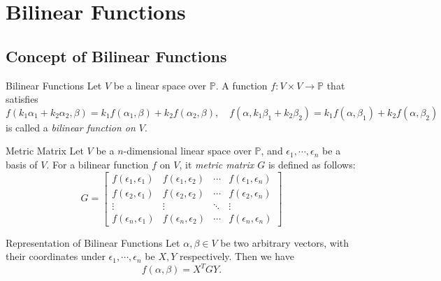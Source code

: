 
\section{Bilinear Functions}

\subsection{Concept of Bilinear Functions}

\begin{definition}{Bilinear Functions}{}
  Let $V$ be a linear space over $\mathbb{P}$.
  A function $f: V\times V \rightarrow \mathbb{P}$ that satisfies
  \begin{equation}
    f(k_1\alpha_1 + k_2\alpha_2, \beta) = k_1 f(\alpha_1, \beta) + k_2f(\alpha_2, \beta), \quad
    f(\alpha, k_1\beta_1 + k_2\beta_2) = k_1 f(\alpha, \beta_1) + k_2f(\alpha, \beta_2)
  \end{equation}
  is called a \emph{bilinear function on $V$}.
\end{definition}

\begin{definition}{Metric Matrix}{}
  Let $V$ be a $n$-dimensional linear space over $\mathbb{P}$,
  and $\epsilon_1,\cdots,\epsilon_n$ be a basis of $V$.
  For a bilinear function $f$ on $V$, 
  it \emph{metric matrix $G$} is defined as follows:
  \begin{equation}
    G=\left[\begin{matrix}
    f(\epsilon_1,\epsilon_1) & f(\epsilon_1,\epsilon_2) & \cdots & f(\epsilon_1,\epsilon_n)\\
    f(\epsilon_2,\epsilon_1) & f(\epsilon_2,\epsilon_2) & \cdots & f(\epsilon_2,\epsilon_n)\\
    \vdots & \vdots & \ddots & \vdots\\
    f(\epsilon_n,\epsilon_1) & f(\epsilon_n,\epsilon_2) & \cdots & f(\epsilon_n,\epsilon_n)
    \end{matrix}\right]
  \end{equation}
\end{definition}

\begin{proposition}{Representation of Bilinear Functions}{}
  Let $\alpha, \beta \in V$ be two arbitrary vectors,
  with their coordinates under $\epsilon_1,\cdots,\epsilon_n$ be $X, Y$ respectively.
  Then we have
  \begin{equation}
    f(\alpha, \beta) = X^T GY.
  \end{equation}
\end{proposition}

